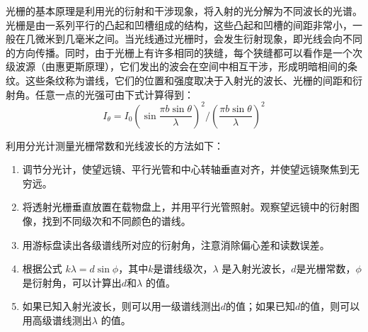 \documentclass[dvipsnames, svgnames,a4paper,11pt]{article}
\begin{document}

光栅的基本原理是利用光的衍射和干涉现象，将入射的光分解为不同波长的光谱。光栅是由一系列平行的凸起和凹槽组成的结构，这些凸起和凹槽的间距非常小，一般在几微米到几毫米之间。当光线通过光栅时，会发生衍射现象，即光线会向不同的方向传播。同时，由于光栅上有许多相同的狭缝，每个狭缝都可以看作是一个次级波源（由惠更斯原理），它们发出的波会在空间中相互干涉，形成明暗相间的条纹。这些条纹称为谱线，它们的位置和强度取决于入射光的波长、光栅的间距和衍射角。任意一点的光强可由下式计算得到：
\[ I_\theta=I_0\left(\sin{\frac{\pi b\sin{\theta}}{\lambda}}\right)^2/{(\frac{\pi b\sin{\theta}}{\lambda})}^2 \]


利用分光计测量光栅常数和光线波长的方法如下：
\begin{enumerate}
	\item 调节分光计，使望远镜、平行光管和中心转轴垂直对齐，并使望远镜聚焦到无穷远。
	
	\item 将透射光栅垂直放置在载物盘上，并用平行光管照射。观察望远镜中的衍射图像，找到不同级次和不同颜色的谱线。
	
	\item 用游标盘读出各级谱线所对应的衍射角，注意消除偏心差和读数误差。
	
	\item 	根据公式 $k\lambda=d\sin{\phi}$，其中$k$是谱线级次，$\lambda$ 是入射光波长，$d$是光栅常数，$\phi$ 是衍射角，可以计算出$d$和$\lambda$ 的值。
	
	\item 如果已知入射光波长，则可以用一级谱线测出$d$的值；如果已知$d$的值，则可以用高级谱线测出$\lambda$ 的值。
\end{enumerate}


%
\end{document}

